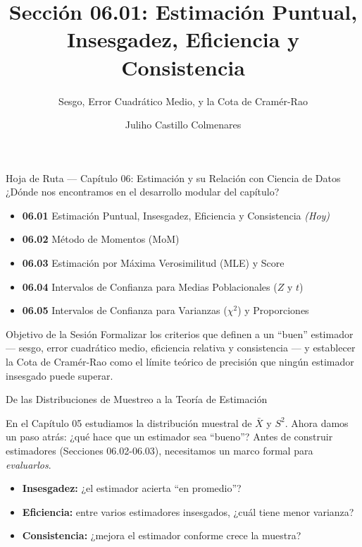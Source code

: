 \documentclass[10pt, aspectratio=169]{beamer}
\title[Calidad de Estimadores]{Sección 06.01: Estimación Puntual, Insesgadez, Eficiencia y Consistencia}
\subtitle{Sesgo, Error Cuadrático Medio, y la Cota de Cramér-Rao}
\author[J. Castillo Colmenares]{Juliho Castillo Colmenares}
\institute{Tecnológico de Monterrey}
\date{\vspace{-1.2cm}}
\begin{document}
\begin{frame}[plain]
  \vspace{-0.8cm}
  \titlepage
\end{frame}

\begin{frame}{Hoja de Ruta --- Capítulo 06: Estimación y su Relación con Ciencia de Datos}
  \footnotesize
  ¿Dónde nos encontramos en el desarrollo modular del capítulo? \pause
  \begin{itemize}\itemsep=0.08em
    \item \textbf{06.01} Estimación Puntual, Insesgadez, Eficiencia y Consistencia \emph{(Hoy)} \pause
    \item \textbf{06.02} Método de Momentos (MoM) \pause
    \item \textbf{06.03} Estimación por Máxima Verosimilitud (MLE) y Score \pause
    \item \textbf{06.04} Intervalos de Confianza para Medias Poblacionales ($Z$ y $t$) \pause
    \item \textbf{06.05} Intervalos de Confianza para Varianzas ($\chi^2$) y Proporciones
  \end{itemize}
  \vspace{-0.05cm}
  \begin{block}{Objetivo de la Sesión}
    Formalizar los criterios que definen a un ``buen'' estimador --- sesgo, error cuadrático medio, eficiencia relativa y consistencia --- y establecer la Cota de Cramér-Rao como el límite teórico de precisión que ningún estimador insesgado puede superar.
  \end{block}
\end{frame}

\begin{frame}{De las Distribuciones de Muestreo a la Teoría de Estimación}
  \footnotesize
  \begin{motivacion}
    En el Capítulo 05 estudiamos la distribución muestral de $\bar X$ y $S^2$. Ahora damos un paso atrás: ¿qué hace que un estimador sea ``bueno''? Antes de construir estimadores (Secciones 06.02-06.03), necesitamos un marco formal para \emph{evaluarlos}.
  \end{motivacion}

  \vspace{0.15cm}
  \pause
  \begin{itemize}\itemsep=0.1cm
    \item \textbf{Insesgadez:} ¿el estimador acierta ``en promedio''? \pause
    \item \textbf{Eficiencia:} entre varios estimadores insesgados, ¿cuál tiene menor varianza? \pause
    \item \textbf{Consistencia:} ¿mejora el estimador conforme crece la muestra?
  \end{itemize}
\end{frame}
\end{document}
